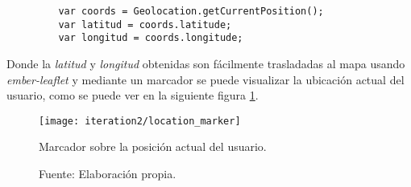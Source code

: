 
\begin{verbatim}
         var coords = Geolocation.getCurrentPosition();
         var latitud = coords.latitude;
         var longitud = coords.longitude;
\end{verbatim}

Donde la \emph{latitud} y \emph{longitud} obtenidas son fácilmente trasladadas al mapa usando \emph{ember-leaflet} y mediante un marcador se puede visualizar la ubicación actual del usuario, como se puede ver en la siguiente figura \ref{fig:location_marker}.

\begin{figure}[H]
 \begin{center}
   \texttt{[image: iteration2/location\_marker]}
   \caption{Marcador sobre la posición actual del usuario.}
   \label{fig:location_marker}
   \caption*{Fuente: Elaboración propia.}
 \end{center}
\end{figure}


